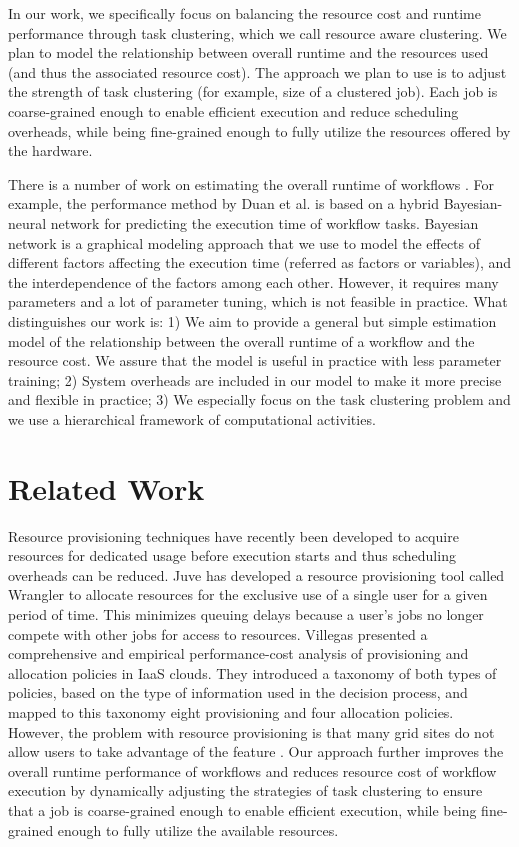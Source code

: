 In our work, we specifically focus on balancing the resource cost and runtime performance through task clustering, which we call resource aware clustering. We plan to model the relationship between overall runtime and the resources used (and thus the associated resource cost). The approach we plan to use is to adjust the strength of task clustering (for example, size of a clustered job). Each job is coarse-grained enough to enable efficient execution and reduce scheduling overheads, while being fine-grained enough to fully utilize the resources offered by the hardware.

There is a number of work on estimating the overall runtime of workflows \cite{Rubing2009, Calasanz2008, Truong2004, Uysal1998}. For example, the performance method by Duan et al. \cite{Rubing2009} is based on a hybrid Bayesian-neural network for predicting the execution time of workflow tasks. Bayesian network is a graphical modeling approach that we use to model the effects of different factors affecting the execution time (referred as factors or variables), and the interdependence of the factors among each other. However, it requires many parameters and a lot of parameter tuning, which is not feasible in practice. What distinguishes our work is: 1) We aim to provide a general but simple estimation model of the relationship between the overall runtime of a workflow and the resource cost. We assure that the model is useful in practice with less parameter training; 2) System overheads are included in our model to make it more precise and flexible in practice; 3) We especially focus on the task clustering problem and we use a hierarchical framework of computational activities. 


\section{Related Work}


Resource provisioning techniques have recently been developed to acquire resources for dedicated usage before execution starts and thus scheduling overheads can be reduced. Juve \cite{Juve2010a} has developed a resource provisioning tool called Wrangler to allocate resources for the exclusive use of a single user for a given period of time. This minimizes queuing delays because a user's jobs no longer compete with other jobs for access to resources. Villegas \cite{Villegas2012} presented a comprehensive and empirical performance-cost analysis of provisioning and allocation policies in IaaS clouds. They introduced a taxonomy of both types of policies, based on the type of information used in the decision process, and mapped to this taxonomy eight provisioning and four allocation policies. However, the problem with resource provisioning is that many grid sites do not allow users to take advantage of the feature \cite{Singh2005a}. Our approach further improves the overall runtime performance of workflows and reduces resource cost of workflow execution by dynamically adjusting the strategies of task clustering to ensure that a job is coarse-grained enough to enable efficient execution, while being fine-grained enough to fully utilize the available resources.


